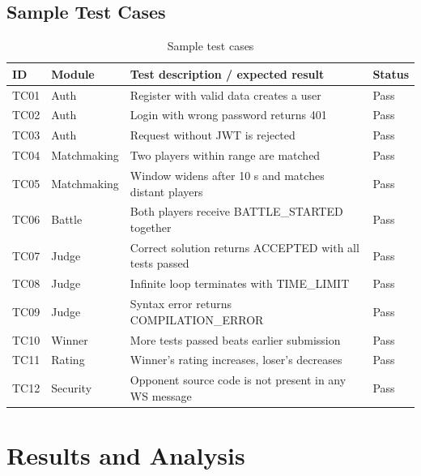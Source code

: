 \documentclass[12pt,a4paper,oneside]{report}
\begin{document}
\section{Sample Test Cases}
\begin{table}[H]
\centering
\small
\begin{tabularx}{\textwidth}{@{}llXl@{}}
\toprule
\textbf{ID} & \textbf{Module} & \textbf{Test description / expected result} & \textbf{Status} \\
\midrule
TC01 & Auth & Register with valid data creates a user & Pass \\
TC02 & Auth & Login with wrong password returns 401 & Pass \\
TC03 & Auth & Request without JWT is rejected & Pass \\
TC04 & Matchmaking & Two players within range are matched & Pass \\
TC05 & Matchmaking & Window widens after 10 s and matches distant players & Pass \\
TC06 & Battle & Both players receive BATTLE\_STARTED together & Pass \\
TC07 & Judge & Correct solution returns ACCEPTED with all tests passed & Pass \\
TC08 & Judge & Infinite loop terminates with TIME\_LIMIT & Pass \\
TC09 & Judge & Syntax error returns COMPILATION\_ERROR & Pass \\
TC10 & Winner & More tests passed beats earlier submission & Pass \\
TC11 & Rating & Winner's rating increases, loser's decreases & Pass \\
TC12 & Security & Opponent source code is not present in any WS message & Pass \\
\bottomrule
\end{tabularx}
\caption{Sample test cases}
\end{table}

\chapter{Results and Analysis}
\begin{center}
\end{center}
\end{document}
